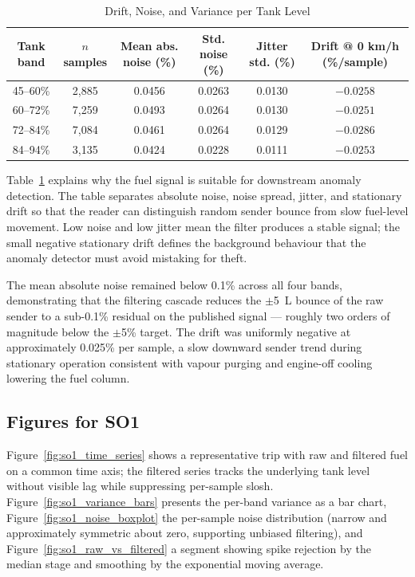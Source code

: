 \begin{table}[!htbp]
\centering
\caption{Drift, Noise, and Variance per Tank Level}
\label{tab:so1_variance}
\scriptsize
\setlength{\tabcolsep}{4pt}
\begin{tabular}{|c|c|c|c|c|c|}
\hline
\textbf{Tank band} & \textbf{$n$ samples} & \textbf{Mean abs. noise (\%)} & \textbf{Std. noise (\%)} & \textbf{Jitter std. (\%)} & \textbf{Drift @ 0 km/h (\%/sample)} \\
\hline
45--60\% & 2{,}885 & 0.0456 & 0.0263 & 0.0130 & $-0.0258$ \\
\hline
60--72\% & 7{,}259 & 0.0493 & 0.0264 & 0.0130 & $-0.0251$ \\
\hline
72--84\% & 7{,}084 & 0.0461 & 0.0264 & 0.0129 & $-0.0286$ \\
\hline
84--94\% & 3{,}135 & 0.0424 & 0.0228 & 0.0111 & $-0.0253$ \\
\hline
\end{tabular}
\normalsize
\end{table}

Table~\ref{tab:so1_variance} explains why the fuel signal is suitable for downstream anomaly detection. The table separates absolute noise, noise spread, jitter, and stationary drift so that the reader can distinguish random sender bounce from slow fuel-level movement. Low noise and low jitter mean the filter produces a stable signal; the small negative stationary drift defines the background behaviour that the anomaly detector must avoid mistaking for theft.

The mean absolute noise remained below 0.1\% across all four bands, demonstrating that the filtering cascade reduces the $\pm$5~L bounce of the raw sender to a sub-0.1\% residual on the published signal --- roughly two orders of magnitude below the $\pm$5\% target. The drift was uniformly negative at approximately 0.025\% per sample, a slow downward sender trend during stationary operation consistent with vapour purging and engine-off cooling lowering the fuel column.

\subsection{Figures for SO1}
Figure~\ref{fig:so1_time_series} shows a representative trip with raw and filtered fuel on a common time axis; the filtered series tracks the underlying tank level without visible lag while suppressing per-sample slosh. Figure~\ref{fig:so1_variance_bars} presents the per-band variance as a bar chart, Figure~\ref{fig:so1_noise_boxplot} the per-sample noise distribution (narrow and approximately symmetric about zero, supporting unbiased filtering), and Figure~\ref{fig:so1_raw_vs_filtered} a segment showing spike rejection by the median stage and smoothing by the exponential moving average.

